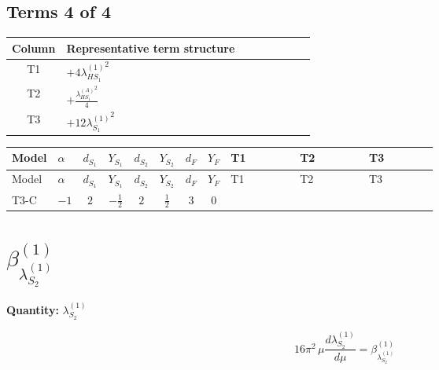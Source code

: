 \documentclass[8pt]{article}
\begin{document}
\begin{landscape}
\subsection*{Terms 4 of 4}
\begin{center}
\begin{tabular}{@{}c >{\raggedright\arraybackslash}p{0.82\linewidth}@{}}
\toprule
Column & Representative term structure \\
\midrule
T1 & \(\displaystyle +4 {\lambda_{HS_1}^{(1)}}^2\) \\
\midrule
T2 & \(\displaystyle +\frac{{\lambda_{HS_1}^{(A)}}^2}{4}\) \\
\midrule
T3 & \(\displaystyle +12 {\lambda_{S_1}^{(1)}}^2\) \\
\midrule
\bottomrule
\end{tabular}
\end{center}
\smallskip
\tiny
\begin{longtable}{@{}llcccccc >{\raggedright\arraybackslash}p{0.21\linewidth} >{\raggedright\arraybackslash}p{0.21\linewidth} >{\raggedright\arraybackslash}p{0.21\linewidth}@{}}
\toprule
Model & $\alpha$ & $d_{S_1}$ & $Y_{S_1}$ & $d_{S_2}$ & $Y_{S_2}$ & $d_F$ & $Y_F$ & T1 & T2 & T3 \\
\midrule
\endfirsthead
\toprule
Model & $\alpha$ & $d_{S_1}$ & $Y_{S_1}$ & $d_{S_2}$ & $Y_{S_2}$ & $d_F$ & $Y_F$ & T1 & T2 & T3 \\
\midrule
\endhead
T3-C & $-1$ & $2$ & $-\frac{1}{2}$ & $2$ & $\frac{1}{2}$ & $3$ & $0$ & \scriptsize\adjustbox{max width=\linewidth}{$\begin{gathered} +4 {\lambda_{HS_1}^{(1)}}^2\end{gathered}$} & \scriptsize\adjustbox{max width=\linewidth}{$\begin{gathered} +\frac{{\lambda_{HS_1}^{(A)}}^2}{4}\end{gathered}$} & \scriptsize\adjustbox{max width=\linewidth}{$\begin{gathered} +12 {\lambda_{S_1}^{(1)}}^2\end{gathered}$} \\
\midrule
\bottomrule
\end{longtable}
\clearpage
\section*{$\beta_{\lambda_{S_2}^{(1)}}^{(1)}$}
\noindent\textbf{Quantity: }$\lambda_{S_2}^{(1)}$\par\smallskip
\[16\pi^2\,\mu\frac{d \lambda_{S_2}^{(1)}}{d\mu}=\beta_{\lambda_{S_2}^{(1)}}^{(1)}\]

\end{landscape}
\end{document}
